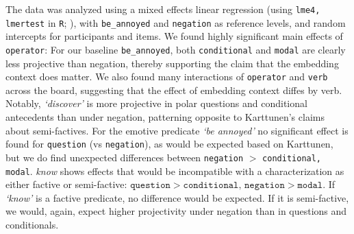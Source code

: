 \documentclass[12pt, a4paper]{scrartcl}
\begin{document}

	\noindent The data was analyzed using a mixed effects linear regression (using \texttt{lme4, lmertest} in \texttt{R}; \citealp{bates_fitting_2015,kuznetsova_lmertest_2016,r_core_team_r_2014}), with \texttt{be\_annoyed} and \texttt{negation} as reference levels, and random intercepts for participants and items.
	We found highly significant main effects of \texttt{operator}: For our baseline \texttt{be\_annoyed}, both \texttt{conditional} and \texttt{modal} are clearly less projective than negation, thereby supporting the claim that the embedding context does matter. We also found many interactions of \texttt{operator} and \texttt{verb} across the board, suggesting that the effect of embedding context diffes by verb. Notably, \emph{\lq discover\rq} is more projective in polar questions and conditional antecedents than under negation, patterning opposite to Karttunen's claims about semi-factives. For the emotive predicate \emph{\lq be annoyed\rq} no significant effect is found for \texttt{question} (vs \texttt{negation}), as would be expected based on Karttunen, but we do find unexpected differences between \texttt{negation} $>$ \texttt{conditional, modal}. \emph{know} shows effects that would be incompatible with a characterization as either factive or semi-factive: $\texttt{question} > \texttt{conditional, negation} > \texttt{modal}$. If \emph{\lq know\rq} is a factive predicate, no difference would be expected. If it is semi-factive, we would, again, expect higher projectivity under negation than in questions and conditionals.

	
\end{document}
